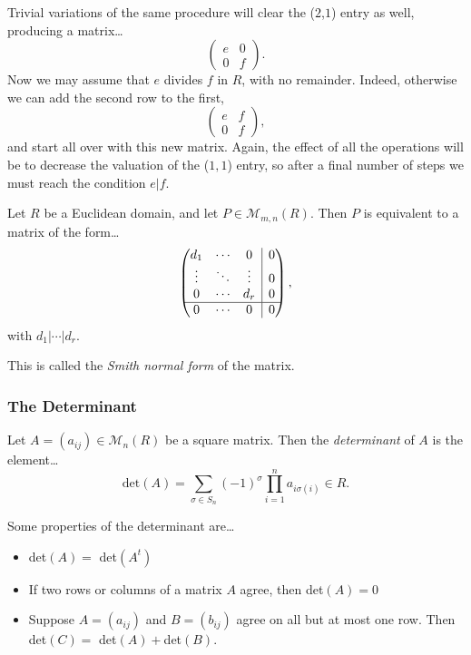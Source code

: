 Trivial variations of the same procedure will clear the ($2$,$1$) entry as well, producing a matrix\dots
\[
\begin{pmatrix}
	e & 0\\
	0 & f
\end{pmatrix}.
\]
Now we may assume that $e$ divides $f$ in $R$, with no remainder. Indeed, otherwise we can add the second row to the first,
\[
\begin{pmatrix}
	e & f\\
	0 & f
\end{pmatrix},
\]
and start all over with this new matrix. Again, the effect of all the operations will be to decrease the valuation of the
($1,1$) entry, so after a final number of steps we must reach the condition $e | f$.

\begin{proposition}
Let $R$ be a Euclidean domain, and let $P \in \mathcal{M}_{m,n}(R)$. Then $P$ is equivalent to a matrix of the form\dots
\[
\begin{pmatrix}
	d_1 & \cdots & 0 & \rvline & 0 \\
	\vdots & \ddots & \vdots & \rvline & 0 \\
	0 & \cdots & d_r & \rvline & 0 \\ \hline
	0 & \cdots & 0 & \rvline & 0
\end{pmatrix},
\]
with $d_1 | \cdots | d_r$.

This is called the \emph{Smith normal form}\label{smithnormalform} of the matrix.
\end{proposition}

\subsubsection{The Determinant}\label{determinant}
Let $A = (a_{ij}) \in \mathcal{M}_n(R)$ be a square matrix. Then the \emph{determinant} of $A$ is the element\dots
$$\textrm{det}(A) = \sum_{\sigma \in S_n} (-1)^{\sigma} \prod^n_{i=1} a_{i \sigma(i)} \in R.$$

\noindent Some properties of the determinant are\dots
\begin{itemize}
  \item det$(A)=$ det$(A^t)$
  \item If two rows or columns of a matrix $A$ agree, then det$(A)=0$
  \item Suppose $A = (a_{ij})$ and $B = (b_{ij})$ agree on all but at most one row. Then det$(C)=$ det$(A)+$det$(B)$.
\end{itemize}

